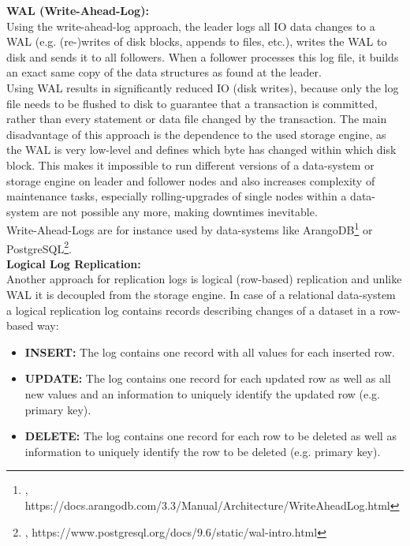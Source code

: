 {\textbf{WAL (Write-Ahead-Log):}\\
Using the write-ahead-log approach, the leader logs all IO data changes to a WAL (e.g. (re-)writes of disk blocks, appends to files, etc.), writes the WAL to disk and sends it to all followers. When a follower processes this log file, it builds an exact same copy of the data structures as found at the leader.\\
Using WAL results in significantly reduced IO (disk writes), because only the log file needs to be flushed to disk to guarantee that a transaction is committed, rather than every statement or data file changed by the transaction. The main disadvantage of this approach is the dependence to the used storage engine, as the WAL is very low-level and defines which byte has changed within which disk block. This makes it impossible to run different versions of a data-system or storage engine on leader and follower nodes and also increases complexity of maintenance tasks, especially rolling-upgrades of single nodes within a data-system are not possible any more, making downtimes inevitable.\\
Write-Ahead-Logs are for instance used by data-systems like ArangoDB\footnote{\cite{ARANGOWAL}, https://docs.arangodb.com/3.3/Manual/Architecture/WriteAheadLog.html} or PostgreSQL\footnote{\cite{PSQLWAL}, https://www.postgresql.org/docs/9.6/static/wal-intro.html}.\\


\textbf{Logical Log Replication:}\\
Another approach for replication logs is logical (row-based) replication and unlike WAL it is decoupled from the storage engine. In case of a relational data-system a logical replication log contains records describing changes of a dataset in a row-based way:\\
\begin{itemize}
\item \textbf{INSERT:} The log contains one record with all values for each inserted row.
\item \textbf{UPDATE:} The log contains one record for each updated row as well as all new values and an information to uniquely identify the updated row (e.g. primary key).
\item \textbf{DELETE:} The log contains one record for each row to be deleted as well as information to uniquely identify the row to be deleted (e.g. primary key).\\
\end{itemize}

}
